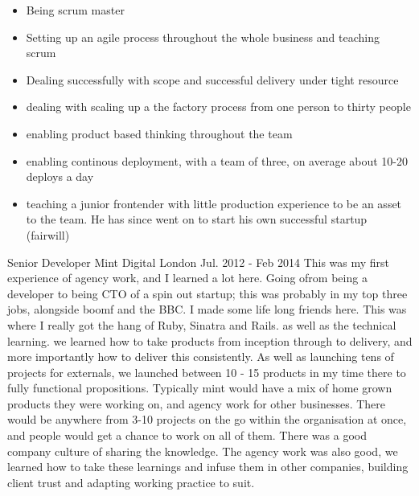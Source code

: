 \begin{cventries}
{\begin{itemize}
        \vspace{0.25cm}
        \setlength\itemsep{0.25em}
        \item {Being scrum master}
        \item {Setting up an agile process throughout the whole business and teaching scrum}
        \item {Dealing successfully with scope and successful delivery under tight resource}
        \item {dealing with scaling up a the factory process from one person to thirty people}
        \item {enabling product based thinking throughout the team}
        \item {enabling continous deployment, with a team of three, on average about 10-20 deploys a day}
        \item {teaching a junior frontender with little production experience to be an asset to the team. He has since went on to start his own successful startup (fairwill)}    
      \end{itemize}
    }

    \cventry
    {Senior Developer} %
    {Mint Digital} %
    {London} %
    {Jul. 2012 - Feb 2014} %
    {
      This was my first experience of agency work, and I learned a lot here. Going ofrom being a developer to being CTO of a spin out startup; this was probably in my top three jobs, alongside boomf and the BBC. I made some life long friends here.
      \newline
      \vspace{0.25cm}
      This was where I really got the hang of Ruby, Sinatra and Rails. as well as the technical learning. we learned how to take products from inception through to delivery, and more importantly how to deliver this consistently. As well as launching tens of projects for externals, we launched between 10 - 15 products in my time there to fully functional propositions.
      \newline
      \vspace{0.25cm}
      Typically mint would have a mix of home grown products they were working on, and agency work for other businesses. There would be anywhere from 3-10 projects on the go within the organisation at once, and people would get a chance to work on all of them. There was a good company culture of sharing the knowledge.
      \newline
      \vspace{0.25cm}
      The agency work was also good, we learned how to take these learnings and infuse them in other companies, building client trust and adapting working practice to suit.
      \vspace{0.25cm}
      }


\end{cventries}
